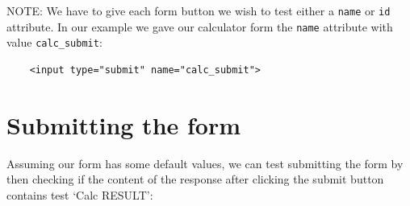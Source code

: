 \documentclass[a4paperpaper,openright]{book}
\newenvironment{Shaded}{}{}
\newcommand{\CommentTok}[1]{\textcolor[rgb]{0.38,0.63,0.69}{\textit{#1}}}
\newcommand{\KeywordTok}[1]{\textcolor[rgb]{0.00,0.44,0.13}{\textbf{#1}}}
\newcommand{\NormalTok}[1]{#1}
\newcommand{\OtherTok}[1]{\textcolor[rgb]{0.00,0.44,0.13}{#1}}
\newcommand{\StringTok}[1]{\textcolor[rgb]{0.25,0.44,0.63}{#1}}
\begin{document}
\begin{Shaded}
\end{Shaded}

NOTE: We have to give each form button we wish to test either a
\texttt{name} or \texttt{id} attribute. In our example we gave our
calculator form the \texttt{name} attribute with value
\texttt{calc\_submit}:

\begin{verbatim}
    <input type="submit" name="calc_submit">
\end{verbatim}

\hypertarget{submitting-the-form}{%
\section{Submitting the form}\label{submitting-the-form}}

Assuming our form has some default values, we can test submitting the
form by then checking if the content of the response after clicking the
submit button contains test `Calc RESULT':
\end{document}
